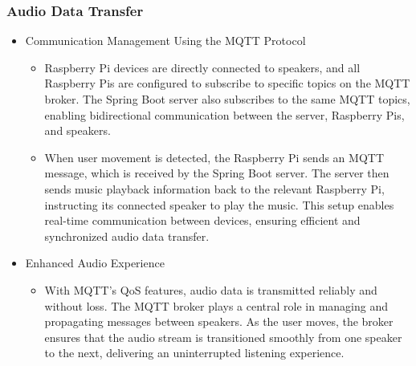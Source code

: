 \documentclass[conference]{IEEEtran}
\begin{document}
\subsubsection{Audio Data Transfer}
\begin{itemize}
    \item Communication Management Using the MQTT Protocol
\begin{itemize}
    \item Raspberry Pi devices are directly connected to speakers, and all Raspberry Pis are configured to subscribe to specific topics on the MQTT broker. The Spring Boot server also subscribes to the same MQTT topics, enabling bidirectional communication between the server, Raspberry Pis, and speakers.\\
    \item When user movement is detected, the Raspberry Pi sends an MQTT message, which is received by the Spring Boot server. The server then sends music playback information back to the relevant Raspberry Pi, instructing its connected speaker to play the music. This setup enables real-time communication between devices, ensuring efficient and synchronized audio data transfer.\\
\end{itemize}
\end{itemize}

\begin{itemize}
    \item Enhanced Audio Experience
\begin{itemize}
    \item With MQTT’s QoS features, audio data is transmitted reliably and without loss. The MQTT broker plays a central role in managing and propagating messages between speakers. As the user moves, the broker ensures that the audio stream is transitioned smoothly from one speaker to the next, delivering an uninterrupted listening experience.
\end{itemize}
\end{itemize}
\end{document}
